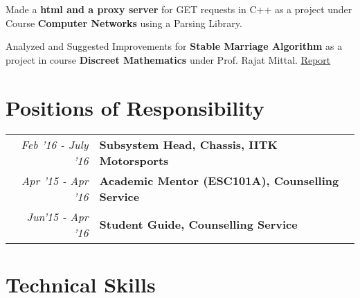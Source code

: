 \documentclass[a4paper]{norm-resume}
\begin{document}
    \vspace{3mm}
    \begin{tightitemize}
    \small
    {
    \item Made a \textbf{html and a proxy server} for GET requests in C++ as a project under Course \textbf{Computer Networks} using a Parsing Library.
    \item Analyzed and Suggested Improvements for \textbf{Stable Marriage Algorithm} as a project in course \textbf{Discreet Mathematics} under Prof. Rajat Mittal. \hfill \href{https://tulsyan.github.io/files/projects/CS201ProjectReport.pdf}{Report}
    }
    \end{tightitemize}

\vspace{2mm}    %


\section{Positions of Responsibility \hrulefill}

    \begin{tabular}{r|p{16cm}}

    \normalsize\emph{Feb '16 - July '16} & \normalsize\textbf{Subsystem Head, Chassis, IITK Motorsports}\\
    \normalsize\emph{Apr '15 - Apr '16} & \normalsize\textbf{Academic Mentor (ESC101A), Counselling Service}\\
    \normalsize\emph{Jun'15 - Apr '16} & \normalsize\textbf{Student Guide, Counselling Service}
    \end{tabular}

\vspace{2mm}    %


\section{Technical Skills \hrulefill}

\vspace{2mm}

 \hfill {} \\
 \hfill {} \\
 \hfill {}
\end{document}
